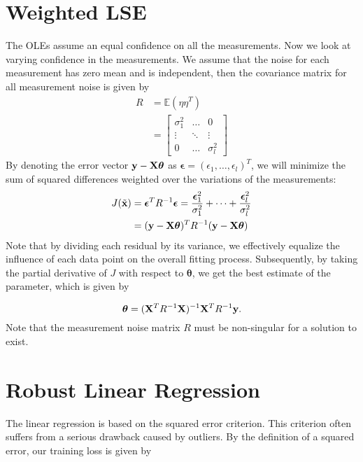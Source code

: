 \section{Weighted LSE}
The OLEs assume an equal confidence on all the measurements. Now we look at varying confidence in the measurements. We assume that the noise for each measurement has zero mean and is independent, then the covariance matrix for all measurement noise is given by
\begin{align*}
	R &= \mathbb{E}(\eta\eta^T)\\
	  &= \begin{bmatrix}
		  \sigma_1^2 & \dots & 0\\
		  \vdots & \ddots & \vdots\\
		  0 & \dots & \sigma_l^2
	  \end{bmatrix}
\end{align*}
By denoting the error vector ${\mathbf{y}}-\mathbf{X}\boldsymbol{\theta}$ as $\boldsymbol{\epsilon} = (\epsilon_1, \dots, \epsilon_l)^T$, we will minimize the sum of squared differences weighted over the variations of the measurements:
\begin{align*}
	J(\tilde{{\mathbf{x}}}) &= \boldsymbol{\epsilon}^TR^{-1}\boldsymbol{\epsilon}=\frac{\boldsymbol{\epsilon}_1^2}{\sigma_1^2}+\dots+\frac{\boldsymbol{\epsilon}_l^2}{\sigma_l^2}\\
					&= ({\mathbf{y}}-\mathbf{X}\boldsymbol{\theta})^TR^{-1}({\mathbf{y}}-\mathbf{X}\boldsymbol{\theta})
\end{align*}
Note that by dividing each residual by its variance, we effectively equalize the influence of each data point on the overall fitting process. Subsequently, by taking the partial derivative of $J$ with respect to $\boldsymbol{\theta}$, we get the best estimate of the parameter, which is given by

$$\boldsymbol{\theta} = (\mathbf{X}^TR^{-1}\mathbf{X})^{-1}\mathbf{X}^TR^{-1}{\mathbf{y}}.$$
Note that the measurement noise matrix $R$ must be non-singular for a solution to exist.

\section{Robust Linear Regression}
\label{sec:robust_linear_regression}

The linear regression is based on the squared error criterion. This criterion often suffers from a serious drawback caused by outliers. By the definition of a squared error, our training loss is given by

